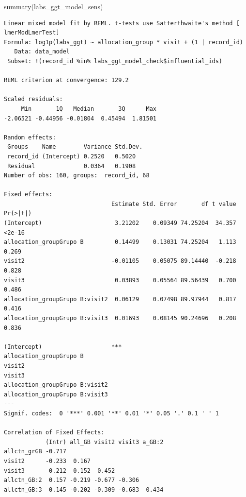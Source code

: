 \documentclass[
  letterpaper,
  DIV=11,
  numbers=noendperiod]{scrartcl}
\newenvironment{Shaded}{\begin{snugshade}}{\end{snugshade}}
\newcommand{\FunctionTok}[1]{\textcolor[rgb]{0.28,0.35,0.67}{#1}}
\newcommand{\NormalTok}[1]{\textcolor[rgb]{0.00,0.23,0.31}{#1}}
\newcommand{\SpecialCharTok}[1]{\textcolor[rgb]{0.37,0.37,0.37}{#1}}
\begin{document}
\begin{Shaded}
\begin{Highlighting}[]
\FunctionTok{summary}\NormalTok{(labs\_ggt\_model\_sens)}
\end{Highlighting}
\end{Shaded}

\begin{verbatim}
Linear mixed model fit by REML. t-tests use Satterthwaite's method [
lmerModLmerTest]
Formula: log1p(labs_ggt) ~ allocation_group * visit + (1 | record_id)
   Data: data_model
 Subset: !(record_id %in% labs_ggt_model_check$influential_ids)

REML criterion at convergence: 129.2

Scaled residuals: 
     Min       1Q   Median       3Q      Max 
-2.06521 -0.44956 -0.01804  0.45494  1.81501 

Random effects:
 Groups    Name        Variance Std.Dev.
 record_id (Intercept) 0.2520   0.5020  
 Residual              0.0364   0.1908  
Number of obs: 160, groups:  record_id, 68

Fixed effects:
                               Estimate Std. Error       df t value Pr(>|t|)
(Intercept)                     3.21202    0.09349 74.25204  34.357   <2e-16
allocation_groupGrupo B         0.14499    0.13031 74.25204   1.113    0.269
visit2                         -0.01105    0.05075 89.14440  -0.218    0.828
visit3                          0.03893    0.05564 89.56439   0.700    0.486
allocation_groupGrupo B:visit2  0.06129    0.07498 89.97944   0.817    0.416
allocation_groupGrupo B:visit3  0.01693    0.08145 90.24696   0.208    0.836
                                  
(Intercept)                    ***
allocation_groupGrupo B           
visit2                            
visit3                            
allocation_groupGrupo B:visit2    
allocation_groupGrupo B:visit3    
---
Signif. codes:  0 '***' 0.001 '**' 0.01 '*' 0.05 '.' 0.1 ' ' 1

Correlation of Fixed Effects:
            (Intr) all_GB visit2 visit3 a_GB:2
allctn_grGB -0.717                            
visit2      -0.233  0.167                     
visit3      -0.212  0.152  0.452              
allctn_GB:2  0.157 -0.219 -0.677 -0.306       
allctn_GB:3  0.145 -0.202 -0.309 -0.683  0.434
\end{verbatim}

\begin{Shaded}
\end{Shaded}
\end{document}
